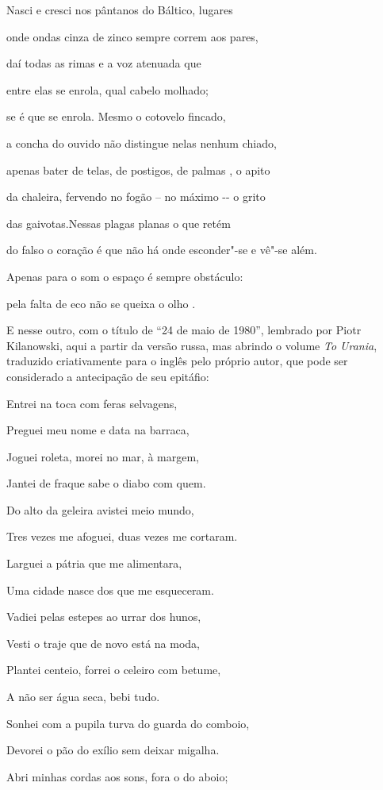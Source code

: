 Nasci e cresci nos pântanos do Báltico, lugares

onde ondas cinza de zinco sempre correm aos pares,

daí todas as rimas e a voz atenuada que

entre elas se enrola, qual cabelo molhado;

se é que se enrola. Mesmo o cotovelo fincado,

a concha do ouvido não distingue nelas nenhum chiado,

apenas bater de telas, de postigos, de palmas , o apito

da chaleira, fervendo no fogão -- no máximo -\/- o grito

das gaivotas.Nessas plagas planas o que retém

do falso o coração é que não há onde esconder"-se e vê"-se além.

Apenas para o som o espaço é sempre obstáculo:

pela falta de eco não se queixa o olho .

E nesse outro, com o título de ``24 de maio de 1980'', lembrado por
Piotr Kilanowski, aqui a partir da versão russa, mas abrindo o volume
\emph{To Urania}, traduzido criativamente para o inglês pelo próprio
autor, que pode ser considerado a antecipação de seu epitáfio:

Entrei na toca com feras selvagens,

Preguei meu nome e data na barraca,

Joguei roleta, morei no mar, à margem,

Jantei de fraque sabe o diabo com quem.

Do alto da geleira avistei meio mundo,

Tres vezes me afoguei, duas vezes me cortaram.

Larguei a pátria que me alimentara,

Uma cidade nasce dos que me esqueceram.

Vadiei pelas estepes ao urrar dos hunos,

Vesti o traje que de novo está na moda,

Plantei centeio, forrei o celeiro com betume,

A não ser água seca, bebi tudo.

Sonhei com a pupila turva do guarda do comboio,

Devorei o pão do exílio sem deixar migalha.

Abri minhas cordas aos sons, fora o do aboio;

